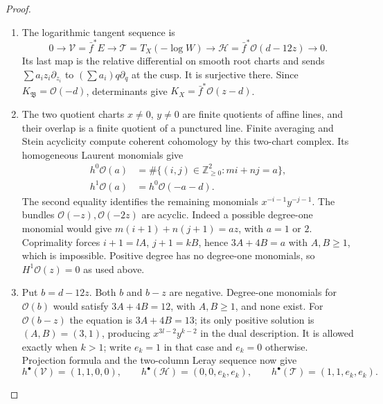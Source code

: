 \begin{proof}
\begin{enumerate}[label=\arabic*.,leftmargin=*]
\item The logarithmic tangent sequence is
\[
 0\longrightarrow\mathcal V=\bar f^*E
 \longrightarrow\mathcal T=T_X(-\log W)
 \longrightarrow\mathcal H=\bar f^*\mathcal O(d-12z)
 \longrightarrow0.
\]
Its last map is the relative differential on smooth root charts
and sends $\sum a_i z_i\partial_{z_i}$ to
$(\sum a_i)q\partial_q$ at the cusp.  It is surjective there.
Since $K_{\mathfrak B}=\mathcal O(-d)$, determinants give
$K_X=\bar f^*\mathcal O(z-d)$.

\item The two quotient charts $x\ne0$, $y\ne0$ are finite quotients
of affine lines, and their overlap is a finite quotient of a
punctured line.  Finite averaging and Stein acyclicity compute
coherent cohomology by this two-chart complex.  Its homogeneous
Laurent monomials give
\[
 \begin{split}
 h^0\mathcal O(a)&=\#\{(i,j)\in\mathbb Z_{\ge0}^2:mi+nj=a\},\\
 h^1\mathcal O(a)&=h^0\mathcal O(-a-d).
 \end{split}
\]
The second equality identifies the remaining monomials
$x^{-i-1}y^{-j-1}$.
The bundles $\mathcal O(-z),\mathcal O(-2z)$ are acyclic.
Indeed a possible degree-one monomial would give
$m(i+1)+n(j+1)=az$, with $a=1$ or $2$.
Coprimality forces $i+1=lA$, $j+1=kB$, hence
$3A+4B=a$ with $A,B\ge1$, which is impossible.
Positive degree has no degree-one monomials, so
$H^1\mathcal O(z)=0$ as used above.

\item Put $b=d-12z$.  Both $b$ and $b-z$ are negative.
Degree-one monomials for $\mathcal O(b)$ would satisfy
$3A+4B=12$, with $A,B\ge1$, and none exist.
For $\mathcal O(b-z)$ the equation is $3A+4B=13$;
its only positive solution is $(A,B)=(3,1)$, producing
$x^{3l-2}y^{k-2}$ in the dual description.  It is allowed
exactly when $k>1$; write $e_k=1$ in that case and $e_k=0$
otherwise.  Projection formula and the two-column Leray sequence
now give
\[
 h^\bullet(\mathcal V)=(1,1,0,0),\qquad
 h^\bullet(\mathcal H)=(0,0,e_k,e_k),\qquad
 h^\bullet(\mathcal T)=(1,1,e_k,e_k).
\]


\end{enumerate}
\end{proof}

